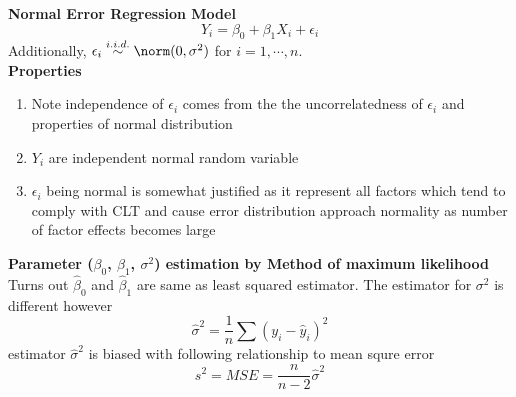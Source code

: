 \documentclass[11pt]{article}
\begin{document}
\begin{defn*}
    \textbf{Normal Error Regression Model} 
    \[
        Y_i = \beta_0 + \beta_1X_i + \epsilon_i
    \]
    Additionally, $\epsilon_i \overset{i.i.d.}{\sim} \norm(0, \sigma^2)$ for $i = 1,\cdots, n$.  \\
    \textbf{Properties}
    \begin{enumerate}
        \item Note independence of $\epsilon_i$ comes from the the uncorrelatedness of $\epsilon_i$ and properties of normal distribution
        \item $Y_i$ are independent normal random variable 
        \item $\epsilon_i$ being normal is somewhat justified as it represent all factors which tend to comply with CLT and cause error distribution approach normality as number of factor effects becomes large
    \end{enumerate}
\end{defn*}


\begin{defn*}
    \textbf{Parameter ($\beta_0$, $\beta_1$, $\sigma^2$) estimation by Method of maximum likelihood} Turns out $\hat{\beta}_0$ and $\hat{\beta}_1$ are same as least squared estimator. The estimator for $\sigma^2$ is different however
    \[
        \hat{\sigma}^2 = \frac{1}{n}\sum (y_i - \hat{y}_i)^2
    \]
    estimator $\hat{\sigma}^2$ is biased with following relationship to mean squre error 
    \[
        s^2 = MSE = \frac{n}{n-2} \hat{\sigma}^2
    \]
\end{defn*}
\end{document}
